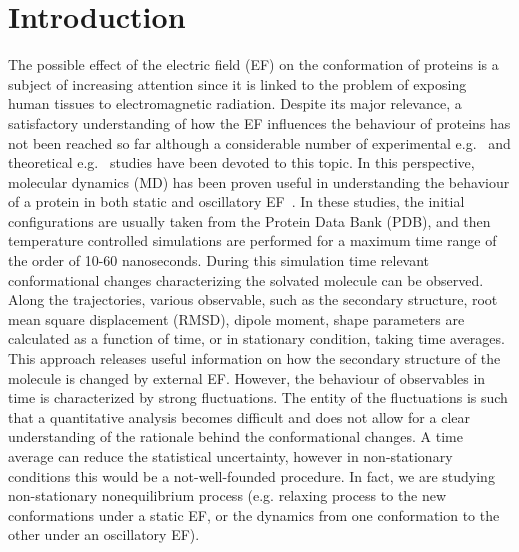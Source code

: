 \documentclass[a4paper,preprint,unsortedaddress,onecolumn]{revtex4-1}
\begin{document}
\section{Introduction}
The possible effect of the electric field (EF) on the conformation of
proteins is a subject of increasing attention since it is linked to the problem of exposing human tissues to
electromagnetic radiation. Despite its major relevance, a
satisfactory understanding of how the EF influences the behaviour of proteins
has not been reached so far although a considerable number of
experimental e.g.~\cite{bohr2000microwave, bohr2000microwave-1,
  dePomerai2000cell, inskip2001cellular, mancinelli2004non} and
theoretical e.g.~\cite{budi2005electric, budi2007effect,
  budi2008comparative, toschi2008effects, astrakas2011electric,
  astrakas2012structural, damm2012can, starzyk2013proteins,
  english2009nonequilibrium, solomentsev2012effects}
studies have been devoted to this topic.
In this perspective, molecular dynamics (MD) has been proven useful in
understanding the behaviour of a protein 
in both static and oscillatory EF~\cite{budi2005electric, budi2007effect, budi2008comparative,
  toschi2008effects, astrakas2011electric, astrakas2012structural,
  damm2012can, starzyk2013proteins, english2009nonequilibrium,
  solomentsev2012effects}. In these studies, the initial
configurations are usually taken from the Protein Data Bank (PDB),
and then temperature controlled simulations are performed for a maximum
time range of the order of 10-60 nanoseconds.
During this simulation time 
relevant conformational changes characterizing the solvated molecule can be observed. 
Along the trajectories, various observable, such as the
secondary structure, root mean square displacement (RMSD), dipole
moment, shape parameters are calculated as a function of time, or
in stationary condition, taking time averages.
This approach releases useful information on how the
secondary structure of the molecule is changed by external  EF.  However,
the behaviour of observables in time is characterized by 
strong
fluctuations. The entity of the fluctuations is such that a quantitative 
analysis becomes difficult and does not allow for  a clear understanding of the rationale behind the conformational changes.
A time average can reduce the statistical uncertainty,
however in non-stationary conditions this would be a not-well-founded procedure.
In fact, we are studying non-stationary nonequilibrium process
(e.g. relaxing process to the new conformations under a static
EF, or the dynamics from one conformation to the other under an oscillatory EF).
\end{document}

